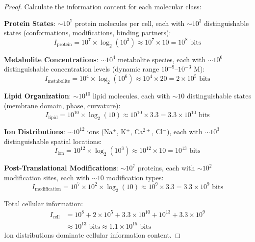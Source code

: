 \documentclass[11pt,a4paper]{article}
\theoremstyle{remark}
\begin{document}
\begin{proof}
Calculate the information content for each molecular class:

\textbf{Protein States}: $\sim 10^7$ protein molecules per cell, each with $\sim 10^3$ distinguishable states (conformations, modifications, binding partners):
\begin{equation}
I_{\text{protein}} = 10^7 \times \log_2(10^3) \approx 10^7 \times 10 = 10^8 \text{ bits}
\end{equation}

\textbf{Metabolite Concentrations}: $\sim 10^4$ metabolite species, each with $\sim 10^6$ distinguishable concentration levels (dynamic range $10^{-9}$--$10^{-3}$ M):
\begin{equation}
I_{\text{metabolite}} = 10^4 \times \log_2(10^6) \approx 10^4 \times 20 = 2 \times 10^5 \text{ bits}
\end{equation}

\textbf{Lipid Organization}: $\sim 10^{10}$ lipid molecules, each with $\sim 10$ distinguishable states (membrane domain, phase, curvature):
\begin{equation}
I_{\text{lipid}} = 10^{10} \times \log_2(10) \approx 10^{10} \times 3.3 = 3.3 \times 10^{10} \text{ bits}
\end{equation}

\textbf{Ion Distributions}: $\sim 10^{12}$ ions (Na$^+$, K$^+$, Ca$^{2+}$, Cl$^-$), each with $\sim 10^3$ distinguishable spatial locations:
\begin{equation}
I_{\text{ion}} = 10^{12} \times \log_2(10^3) \approx 10^{12} \times 10 = 10^{13} \text{ bits}
\end{equation}

\textbf{Post-Translational Modifications}: $\sim 10^7$ proteins, each with $\sim 10^2$ modification sites, each with $\sim 10$ modification types:
\begin{equation}
I_{\text{modification}} = 10^7 \times 10^2 \times \log_2(10) \approx 10^9 \times 3.3 = 3.3 \times 10^9 \text{ bits}
\end{equation}

Total cellular information:
\begin{align}
I_{\text{cell}} &= 10^8 + 2 \times 10^5 + 3.3 \times 10^{10} + 10^{13} + 3.3 \times 10^9 \\
&\approx 10^{13} \text{ bits} \approx 1.1 \times 10^{15} \text{ bits}
\end{align}
Ion distributions dominate cellular information content.
\end{proof}
\end{document}
